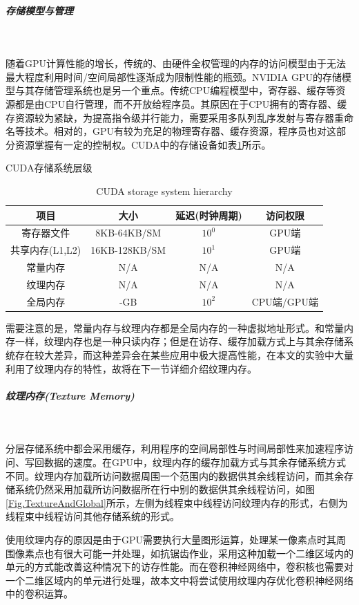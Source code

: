 \subparagraph{存储模型与管理}~{}
\par 随着GPU计算性能的增长，传统的、由硬件全权管理的内存的访问模型由于无法最大程度利用时间/空间局部性逐渐成为限制性能的瓶颈\cite{HIER}。NVIDIA GPU的存储模型与其存储管理系统也是另一个重点。传统CPU编程模型中，寄存器、缓存等资源都是由CPU自行管理，而不开放给程序员。其原因在于CPU拥有的寄存器、缓存资源较为紧缺，为提高指令级并行能力，需要采用多队列乱序发射与寄存器重命名等技术。相对的，GPU有较为充足的物理寄存器、缓存资源，程序员也对这部分资源掌握有一定的控制权\cite{CUDAPROG}。CUDA中的存储设备如表\ref{table-存储}所示。
\begin{table}
	\centering
	\renewcommand{\thetable}{\arabic{section}-\arabic{table} }
	\renewcommand{\tablename}{表}
	\caption{CUDA存储系统层级\cite{CUDAPROG}}
	\addtocounter{table}{-1}
	\renewcommand{\thetable}{\arabic{section}-\arabic{table} }
	\renewcommand{\tablename}{Table}
	\caption{CUDA storage system hierarchy\cite{CUDAPROG}}
	\begin{tabular}{cccc}
		\toprule
		项目				&	大小			&	延迟(时钟周期)	&	访问权限	\\
		\midrule
		寄存器文件		&	8KB-64KB/SM		&	$ 10^0 $	& GPU端	\\
		共享内存(L1,L2)	&	16KB-128KB/SM	&	$ 10^1 $	&	GPU端\\
		常量内存		&	N/A				&	N/A		&	N/A	\\
		纹理内存		&	N/A				&	N/A		&	N/A \\
		全局内存		&	-GB				&	$ 10^2 $	&	CPU端/GPU端 \\
		\bottomrule
	\end{tabular} \label{table-存储}
\end{table}
\par 需要注意的是，常量内存与纹理内存都是全局内存的一种虚拟地址形式。和常量内存一样，纹理内存也是一种只读内存；但是在访存、缓存加载方式上与其余存储系统存在较大差异，而这种差异会在某些应用中极大提高性能，在本文的实验中大量利用了纹理内存的特性，故将在下一节详细介绍纹理内存。
\subparagraph{纹理内存(Texture Memory)}~{}
\par 分层存储系统中都会采用缓存，利用程序的空间局部性与时间局部性来加速程序访问、写回数据的速度。在GPU中，纹理内存的缓存加载方式与其余存储系统方式不同。纹理内存加载所访问数据周围一个范围内的数据\cite{THEDESIGN}供其余线程访问，而其余存储系统仍然采用加载所访问数据所在行中别的数据供其余线程访问，如图\ref{Fig.TextureAndGlobal}所示，左侧为线程束中线程访问纹理内存的形式，右侧为线程束中线程访问其他存储系统的形式。
\par 使用纹理内存的原因是由于GPU需要执行大量图形运算，处理某一像素点时其周围像素点也有很大可能一并处理，如抗锯齿作业，采用这种加载一个二维区域内的单元的方式能改善这种情况下的访存性能。而在卷积神经网络中，卷积核也需要对一个二维区域内的单元进行处理，故本文中将尝试使用纹理内存优化卷积神经网络中的卷积运算。
